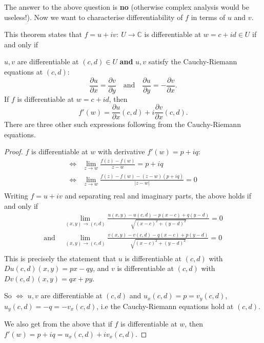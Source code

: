 \documentclass[egregdoesnotlikesansseriftitles,a4paper]{scrartcl}
\begin{document}
The answer to the above question is \textbf{no} (otherwise complex analysis would be useless!). Now we want to characterise differentiability of $f$ in terms of $u$ and $v$. 

\begin{theorem}
     This theorem states that $f=u+iv: \ U \rightarrow \mathbb{C}$ is differentiable at $w=c+id \in U$ if and only if 

     $u,v$ are differentiable at $(c,d) \in U$ \textbf{and} $u,v$ satisfy the Cauchy-Riemann equations at $(c,d)$: \[
     \frac{\partial u}{\partial x}=\frac{\partial v}{\partial y} \quad \text{and} \quad \frac{\partial u}{\partial y}=- \frac{\partial v}{\partial x}
     .\]  
     If $f$ is differentiable at $w=c+id$, then \[
     f' (w)= \frac{\partial u}{\partial x} (c,d)+i \frac{\partial v}{\partial x} (c,d)
     .\]  There are three other such expressions following from the Cauchy-Riemann equations. 
\end{theorem}
\begin{proof}
     $f$ is differentiable at $w$ with derivative $f' (w)=p+iq$:
     \begin{align*}
         \iff & \lim_{z \rightarrow w} \frac{f (z)- f (w)}{z-w}=p+iq\\
         \iff & \lim_{z \rightarrow w} \frac{f (z)- f (w)- (z-w)(p+iq)}{|z-w|}=0\\
     \end{align*}
     Writing $f=u+iv$ and separating real and imaginary parts, the above holds if and only if 
     \begin{align*}
        & \lim_{(x,y) \rightarrow (c,d)} \frac{u (x,y)- u (c,d)-p (x-c)+q (y-d)}{\sqrt{(x-c)^2+ (y-d)^2}}=0\\
        \text{and } & \lim_{(x,y) \rightarrow (c,d)} \frac{v (x,y)- v (c,d)-q (x-c)+p (y-d)}{\sqrt{(x-c)^2+ (y-d)^2}}=0\\
     \end{align*}
     This is precisely the statement that $u$ is differentiable at $(c,d)$ with $Du (c,d)(x,y)=px-qy$, and $v$ is differentiable at $(c,d)$ with $Dv (c,d)(x,y)=qx+py$. 

     So $\iff$ $u,v$ are differentiable at $(c,d)$ and $u_{x}(c,d)=p=v_{y}(c,d)$, $u_{y}(c,d)=-q=-v_{x}(c,d)$, i.e the Cauchy-Riemann equations hold at $(c,d)$. 

     We also get from the above that if $f$ is differentiable at $w$, then $f' (w)=p+iq=u_{x}(c,d)+iv_{x} (c,d)$.  
\end{proof}
\end{document}
